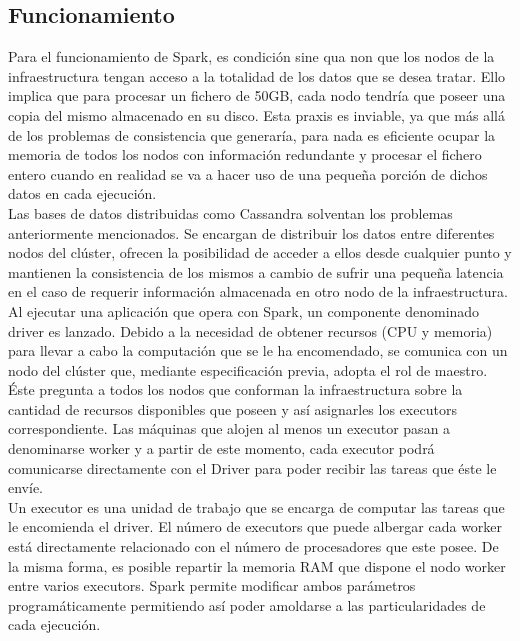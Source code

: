 \subsection{Funcionamiento}

Para el funcionamiento de Spark, es condición sine qua non que los nodos de la infraestructura tengan acceso a la totalidad de los datos que se desea tratar. Ello implica que para procesar un fichero de 50GB, cada nodo tendría que poseer una copia del mismo almacenado en su disco. Esta praxis es inviable, ya que más allá de los problemas de consistencia que generaría, para nada es eficiente ocupar la memoria de todos los nodos con información redundante y procesar el fichero entero cuando en realidad se va a hacer uso de una pequeña porción de dichos datos en cada ejecución.\\

Las bases de datos distribuidas como Cassandra solventan los problemas anteriormente mencionados. Se encargan de distribuir los datos entre diferentes nodos del clúster, ofrecen la posibilidad de acceder a ellos desde cualquier punto y mantienen la consistencia de los mismos a cambio de sufrir una pequeña latencia en el caso de requerir información almacenada en otro nodo de la infraestructura.\\ 

Al ejecutar una aplicación que opera con Spark, un componente denominado driver es lanzado. Debido a la necesidad de obtener recursos (CPU y memoria) para llevar a cabo la computación que se le ha encomendado, se comunica con un nodo del clúster que, mediante especificación previa, adopta el rol de maestro. Éste pregunta a todos los nodos que conforman la infraestructura sobre la cantidad de recursos disponibles que poseen y así asignarles los executors correspondiente. Las máquinas que alojen al menos un executor pasan a denominarse worker y a partir de este momento, cada executor podrá comunicarse directamente con el Driver para poder recibir las tareas que éste le envíe.\\

Un executor es una unidad de trabajo que se encarga de computar las tareas que le encomienda el driver. El número de executors que puede albergar cada worker está directamente relacionado con el número de procesadores que este posee. De la misma forma, es posible repartir la memoria RAM que dispone el nodo worker entre varios executors. Spark permite modificar ambos parámetros programáticamente permitiendo así poder amoldarse a las particularidades de cada ejecución.\\

